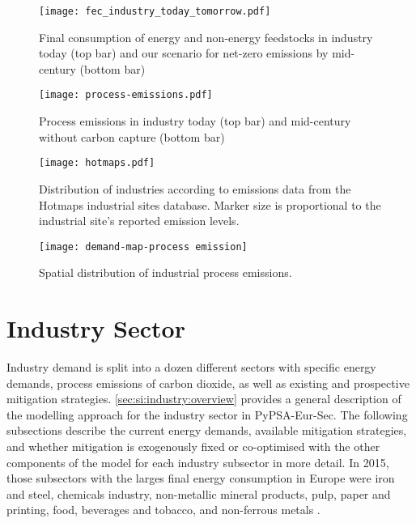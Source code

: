\begin{SCfigure}
    \texttt{[image: fec\_industry\_today\_tomorrow.pdf]}
    \caption{Final consumption of energy and non-energy feedstocks in industry today (top bar) and
    our scenario for net-zero emissions by mid-century (bottom bar)}
    \label{fig:fec-industry}
\end{SCfigure}

\begin{SCfigure}
    \texttt{[image: process-emissions.pdf]}
    \caption{Process emissions in industry today (top bar) and mid-century without carbon capture (bottom bar)}
    \label{fig:process-emissions}
\end{SCfigure}


\begin{SCfigure}
    \texttt{[image: hotmaps.pdf]}
    \caption{Distribution of industries according to emissions data from the Hotmaps industrial sites database. Marker size is proportional to the industrial site's reported emission levels.}
    \label{fig:hotmaps}
\end{SCfigure}

\begin{SCfigure}
    \texttt{[image: demand-map-process emission]}
    \caption{Spatial distribution of industrial process emissions.}
    \label{fig:spatial-process-emissions}
\end{SCfigure}

\section{Industry Sector}
\label{sec:si:industry}

Industry demand is split into a dozen different sectors with specific energy
demands, process emissions of carbon dioxide, as well as existing and
prospective mitigation strategies. \cref{sec:si:industry:overview} provides a
general description of the modelling approach for the industry sector in
PyPSA-Eur-Sec. The following subsections describe the current energy demands,
available mitigation strategies, and whether mitigation is exogenously fixed or
co-optimised with the other components of the model for each industry subsector
in more detail. In 2015, those subsectors with the larges final energy
consumption in Europe were iron and steel, chemicals industry, non-metallic
mineral products, pulp, paper and printing, food, beverages and tobacco, and
non-ferrous metals .

